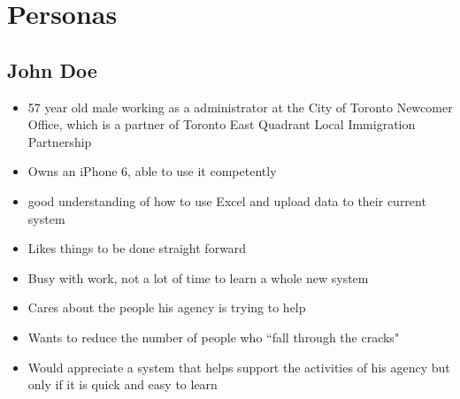 \documentclass[12pt]{article}
\begin{document}
\textcolor{black}{\tableofcontents}
\pagebreak


\section{Personas}
\subsection{John Doe}
\begin{itemize}%
\item 57 year old male working as a administrator at the City of Toronto Newcomer Office, which is a partner of Toronto East Quadrant Local Immigration Partnership 
\item Owns an iPhone 6, able to use it competently
\item good understanding of how to use Excel and upload data to their current system
\item Likes things to be done straight forward
\item Busy with work, not a lot of time to learn a whole new system
\item Cares about the people his agency is trying to help
\item Wants to reduce the number of people who ``fall through the cracks"
\item Would appreciate a system that helps support the activities of his agency but only if it is quick and easy to learn
 \end{itemize}
\end{document}
